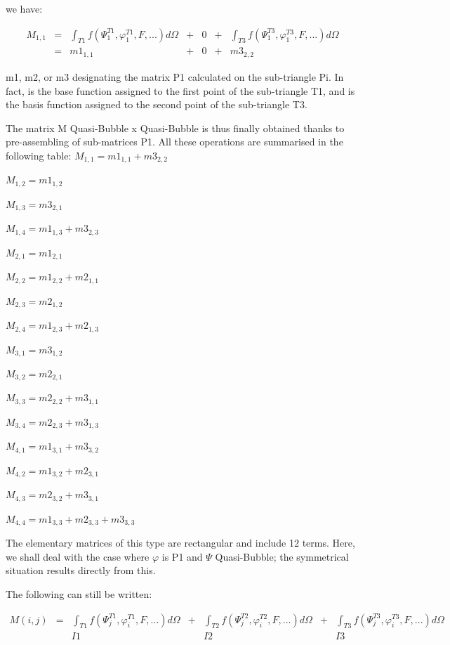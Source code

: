we have:

\[
\begin{array}{ccccccc}
M_{1,1} & = & \int _{T1}f(\Psi _{1}^{T1} ,\varphi _{1}^{T1} ,F,...)d\Omega & + & 0 & + & \int _{T3}f(\Psi _{1}^{T3} ,\varphi _{1}^{T3} ,F,...)d\Omega \\
& = &            m1_{1,1}                                                  & + & 0 & + & m3_{2,2}
\end{array}
\]

m1, m2, or m3 designating the matrix P1 calculated on the sub-triangle Pi. In
fact,  is the base function assigned to the first point of the sub-triangle T1,
and  is the basis function assigned to the second point of the sub-triangle T3.

The matrix M Quasi-Bubble x Quasi-Bubble is thus finally obtained thanks to
pre-assembling of sub-matrices P1. All these operations are summarised in the
following table:
$M_{1,1} = m1_{1,1} + m3_{2,2}$

$M_{1,2} = m1_{1,2}$

$M_{1,3} = m3_{2,1}$

$M_{1,4} = m1_{1,3} + m3_{2,3}$

$M_{2,1} = m1_{2,1}$

$M_{2,2} = m1_{2,2} + m2_{1,1}$

$M_{2,3} = m2_{1,2}$

$M_{2,4} = m1_{2,3} + m2_{1,3}$

$M_{3,1} = m3_{1,2}$

$M_{3,2} = m2_{2,1}$

$M_{3,3} = m2_{2,2} + m3_{1,1}$

$M_{3,4} = m2_{2,3} + m3_{1,3}$

$M_{4,1} = m1_{3,1} + m3_{3,2}$

$M_{4,2} = m1_{3,2} + m2_{3,1}$

$M_{4,3} = m2_{3,2} + m3_{3,1}$

$M_{4,4} = m1_{3,3} + m2_{3,3} + m3_{3,3}$


The elementary matrices of this type are rectangular and include 12 terms.
Here, we shall deal with the case where $\varphi$ is P1 and $\Psi$
Quasi-Bubble; the symmetrical situation results directly from this.

The following can still be written:

\[
\begin{array}{ccccccc}
M(i,j) & = &\int _{T1}f(\Psi _{j}^{T1} ,\varphi _{i}^{T1} ,F,...)d\Omega & + & \int _{T2}f(\Psi _{j}^{T2} ,\varphi _{i}^{T2} ,F,...)d\Omega & + & \int _{T3}f(\Psi _{j}^{T3} ,\varphi _{i}^{T3} ,F,...)d\Omega  \\
       &   &   I1                                                         &   &    I2                                                        &   &   I3
\end{array}
\]

